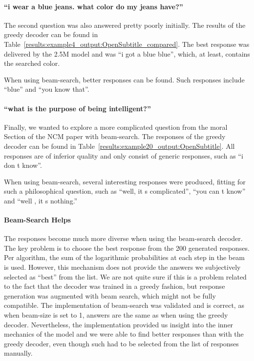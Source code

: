 \paragraph{``i wear a blue jeans. what color do my jeans have?''} The second question was also answered pretty poorly initially. The results of the greedy decoder can be found in Table~\ref{results:example4_output:OpenSubtitle_compared}. The best response was delivered by the 2.5M model and was ``i got a blue blue'', which, at least, contains the searched color.

When using beam-search, better responses can be found. Such responses include ``blue'' and ``you know that''.

\paragraph{``what is the purpose of being intelligent?''} Finally, we wanted to explore a more complicated question from the moral Section of the NCM paper with beam-search. The responses of the greedy decoder can be found in Table~\ref{results:example20_output:OpenSubtitle}. All responses are of inferior quality and only consist of generic responses, such as ``i don t know''.

When using beam-search, several interesting responses were produced, fitting for such a philosophical question, such as ``well, it s complicated'', ``you can t know'' and ``well , it s nothing.''

\paragraph{Beam-Search Helps} The responses become much more diverse when using the beam-search decoder. The key problem is to choose the best response from the 200 generated responses. Per algorithm, the sum of the logarithmic probabilities at each step in the beam is used. However, this mechanism does not provide the answers we subjectively selected as ``best'' from the list. We are not quite sure if this is a problem related to the fact that the decoder was trained in a greedy fashion, but response generation was augmented with beam search, which might not be fully compatible. The implementation of beam-search was validated and is correct, as when beam-size is set to 1, answers are the same as when using the greedy decoder. Nevertheless, the implementation provided us insight into the inner mechanics of the model and we were able to find better responses than with the greedy decoder, even though such had to be selected from the list of responses manually.


